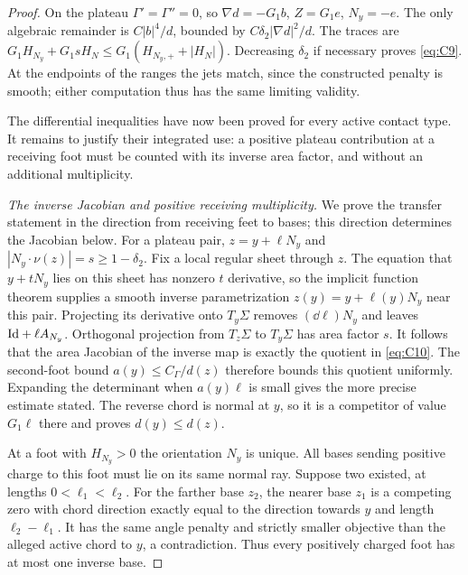 \begin{proof}
On the plateau $\Gamma'=\Gamma''=0$, so
$\nabla d=-G_1b$, $Z=G_1e$, $N_y=-e$.
The only algebraic remainder is $C|b|^4/d$, bounded by
$C\delta_2|\nabla d|^2/d$.  The traces are
$G_1H_{N_y}+G_1sH_N\le G_1(H_{N_y,+}+|H_N|)$.
Decreasing $\delta_2$ if necessary proves \eqref{eq:C9}.
At the endpoints of the ranges the jets match, since the constructed
penalty is smooth; either computation thus has the same limiting
validity.

The differential inequalities have now been proved for every active
contact type.  It remains to justify their integrated use: a positive
plateau contribution at a receiving foot must be counted with its
inverse area factor, and without an additional multiplicity.

\emph{The inverse Jacobian and positive receiving multiplicity.}
We prove the transfer statement in the direction from receiving feet
to bases; this direction determines the Jacobian below.
For a plateau pair, $z=y+\ell N_y$ and
$|N_y\cdot\nu(z)|=s\ge1-\delta_2$.  Fix a local regular sheet
through $z$.  The equation that $y+tN_y$ lies on this sheet has
nonzero $t$ derivative, so the implicit function theorem supplies
a smooth inverse parametrization
$z(y)=y+\ell(y)N_y$ near this pair.  Projecting its derivative onto
$T_y\Sigma$ removes $(\dd\ell)N_y$ and leaves
$\mathrm{Id}+\ell A_{N_y}$.  Orthogonal projection from $T_z\Sigma$ to
$T_y\Sigma$ has area factor $s$.  It follows that the area
Jacobian of the inverse map is exactly the quotient in
\eqref{eq:C10}.  The second-foot bound $a(y)\le C_\Gamma/d(z)$
therefore bounds this quotient uniformly.  Expanding the determinant
when $a(y)\ell$ is small gives the more precise estimate stated.
The reverse chord is normal at $y$, so it is a competitor of value
$G_1\ell$ there and proves $d(y)\le d(z)$.

At a foot with $H_{N_y}>0$ the orientation $N_y$ is unique.  All
bases sending positive charge to this foot must lie on its same
normal ray.  Suppose two existed, at lengths $0<\ell_1<\ell_2$.
For the farther base $z_2$, the nearer base $z_1$ is a competing
zero with chord direction exactly equal to the direction towards
$y$ and length $\ell_2-\ell_1$.  It has the same angle penalty and
strictly smaller objective than the alleged active chord to $y$,
a contradiction.  Thus every positively charged foot has at most
one inverse base.


\end{proof}
